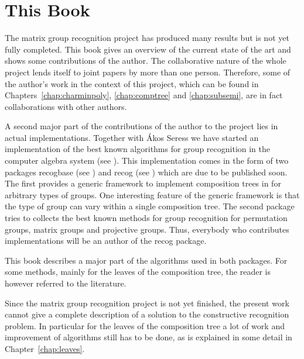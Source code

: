\section*{This Book}

The matrix group recognition project has produced many
results but is not yet fully completed.
This book gives an overview of the current state of the art and
shows some contributions of the author. The collaborative nature of the
whole project lends itself to joint papers by more than one person.
Therefore, some of the author's work in the context of this project, which can
be found in Chapters~\ref{chap:charminpoly}, \ref{chap:comptree} and
\ref{chap:subsemi}, are in fact collaborations with other authors.

A second major part of the contributions of the author to the project lies
in actual implementations. Together with \'Akos Seress we have started an
implementation of the best known algorithms for group recognition in the
{\GAP} computer algebra system (see \cite{GAP4}). This implementation comes
in the form of two {\GAP} packages \textsf{recogbase} (see
%
%
\cite{recogbase}) and \textsf{recog} (see \cite{recog})
which are due to be published soon. The first provides a generic framework
to implement composition trees in {\GAP} for arbitrary types of groups. 
%
One interesting feature of the generic framework is that the type of group
can vary within a single composition tree. The
second package tries to collects the best known methods for group
recognition for permutation groups, matrix groups and projective groups.
Thus, everybody who contributes implementations will be an author of the
\textsf{recog} package. 

This book describes a major part of the algorithms used in both
packages. For some methods, mainly for the leaves of the composition tree,
the reader is however referred to the literature.
%

Since the matrix group recognition project is not yet finished, the present work
cannot give a complete description of a solution to the constructive
recognition problem. In particular for the leaves of the composition tree
a lot of work and improvement of algorithms still has to be done, as is
explained in some detail in Chapter~\ref{chap:leaves}.
%

